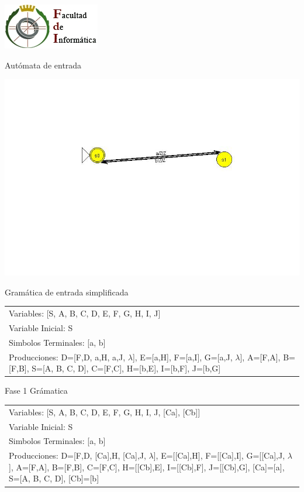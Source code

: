 \documentclass[a4paper,11pt]{article}
\newcommand{\MYp}[1]{ {\color[rgb]{0.392,0.392,0.392}#1} }
\begin{document}
\includegraphics{fdi.jpg}
\newline
\newline
\newline

\MYp{\Huge Aut\'{o}mata de entrada}
\begin{center}
\includegraphics[width=\textwidth]{imagenEntrada.jpg}
\end{center}
\MYp{\Huge Gram\'{a}tica de entrada simplificada\newline
\newline
}
\begin{center}\begin{tabular}{ m{15cm} }


Variables: [S, A, B, C, D, E, F, G, H, I, J] \\
Variable Inicial: S \\
Simbolos Terminales: [a, b] \\
Producciones: {D=[F,D, a,H, a,J, $\lambda$], E=[a,H], F=[a,I], G=[a,J, $\lambda$], A=[F,A], B=[F,B], S=[A, B, C, D], C=[F,C], H=[b,E], I=[b,F], J=[b,G]} \\

\end{tabular}
\end{center}\newpage
\MYp{\Huge Fase 1}
\newline
\MYp{\Huge Gr\'amatica}
\newline
\begin{center}\begin{tabular}{ m{15cm} }


Variables: [S, A, B, C, D, E, F, G, H, I, J, [Ca], [Cb]] \\
Variable Inicial: S \\
Simbolos Terminales: [a, b] \\
Producciones: {D=[F,D, [Ca],H, [Ca],J, $\lambda$], E=[[Ca],H], F=[[Ca],I], G=[[Ca],J, $\lambda$], A=[F,A], B=[F,B], C=[F,C], H=[[Cb],E], I=[[Cb],F], J=[[Cb],G], [Ca]=[a], S=[A, B, C, D], [Cb]=[b]} \\

\end{tabular}
\end{center}
\end{document}
